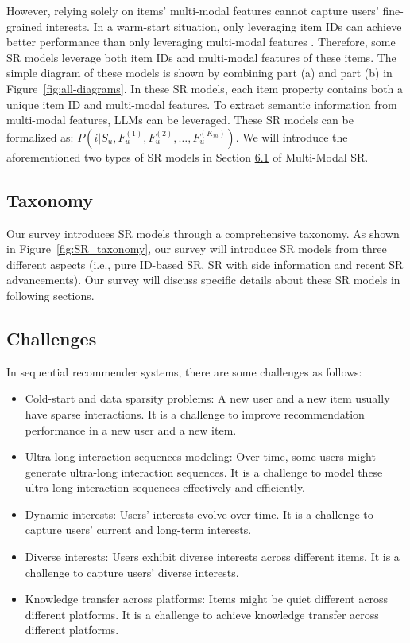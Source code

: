 \documentclass[review]{fcs}
\begin{document}
	However, relying solely on items' multi-modal features cannot capture users' fine-grained interests. In a warm-start situation, only leveraging item IDs can achieve better performance than only leveraging multi-modal features \cite{MoRec}. Therefore, some SR models leverage both item IDs and multi-modal features of these items. The simple diagram of these models is shown by combining part (a) and part (b) in Figure~\ref{fig:all-diagrams}. In these SR models, each item property contains both a unique item ID and multi-modal features. To extract semantic information from multi-modal features, LLMs can be leveraged. These SR models can be formalized as: $P(i|S_{u}, F_{u}^{(1)}, F_{u}^{(2)}, \ldots, F_{u}^{(K_{m})})$. We will introduce the aforementioned two types of SR models in Section \hyperref[sec:multi_modal_SR]{6.1} of Multi-Modal SR.
	\subsection{Taxonomy}
	Our survey introduces SR models through a comprehensive taxonomy. As shown in Figure~\ref{fig:SR_taxonomy}, our survey will introduce SR models from three different aspects (i.e., pure ID-based SR, SR with side information and recent SR advancements). Our survey will discuss specific details about these SR models in following sections.
	\subsection{Challenges}
	In sequential recommender systems, there are some challenges as follows:
	\begin{itemize}
		\item Cold-start and data sparsity problems: A new user and a new item usually have sparse interactions. It is a challenge to improve recommendation performance in a new user and a new item.
		\item Ultra-long interaction sequences modeling: Over time, some users might generate ultra-long interaction sequences. It is a challenge to model these ultra-long interaction sequences effectively and efficiently.
		\item Dynamic interests: Users' interests evolve over time. It is a challenge to capture users' current and long-term interests.
		\item Diverse interests: Users exhibit diverse interests across different items. It is a challenge to capture users' diverse interests.
		\item Knowledge transfer across platforms: Items might be quiet different across different platforms. It is a challenge to achieve knowledge transfer across different platforms.
	\end{itemize}
\end{document}
